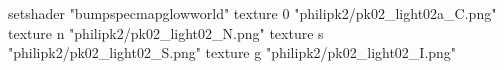 setshader "bumpspecmapglowworld"
    texture 0 "philipk2/pk02_light02a_C.png"
    texture n "philipk2/pk02_light02_N.png"
    texture s "philipk2/pk02_light02_S.png"
    texture g "philipk2/pk02_light02_I.png"